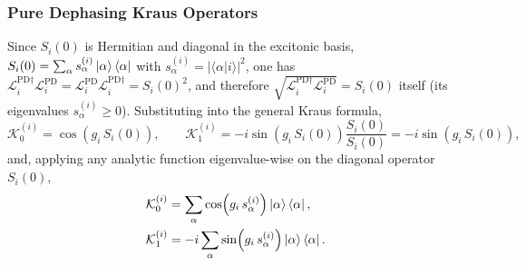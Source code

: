 \documentclass[a4paper,12pt]{article}
\begin{document}
\subsubsection{Pure Dephasing Kraus Operators}
Since $S_{i}(0)$ is Hermitian and diagonal in the excitonic basis, $S_{i}(0) = \sum_{\alpha} s_{\alpha}^{(i)} \Ket{\alpha}\Bra{\alpha}$ with $s_{\alpha}^{(i)} = |\langle\alpha|i\rangle|^{2}$, one has $\mathcal{L}_{i}^{\text{PD}\dagger}\mathcal{L}_{i}^{\text{PD}} = \mathcal{L}_{i}^{\text{PD}}\mathcal{L}_{i}^{\text{PD}\dagger} = S_{i}(0)^{2}$, and therefore $\sqrt{\mathcal{L}_{i}^{\text{PD}\dagger}\mathcal{L}_{i}^{\text{PD}}} = S_{i}(0)$ itself (its eigenvalues $s_\alpha^{(i)}\geq0$). Substituting into the general Kraus formula,
\begin{equation}
	\mathcal{K}_{0}^{(i)} = \cos\!\left(g_{i}\, S_{i}(0)\right), \qquad
	\mathcal{K}_{1}^{(i)} = -i\sin\!\left(g_{i}\, S_{i}(0)\right)\frac{S_{i}(0)}{S_{i}(0)} = -i\sin\!\left(g_{i}\, S_{i}(0)\right),
\end{equation}
and, applying any analytic function eigenvalue-wise on the diagonal operator $S_i(0)$,
\begin{align}
	\mathcal{K}_{0}^{(i)} &= \sum_{\alpha} \cos\!\left(g_{i}\, s_{\alpha}^{(i)}\right) \Ket{\alpha}\Bra{\alpha}, \\
	\mathcal{K}_{1}^{(i)} &= -i \sum_{\alpha} \sin\!\left(g_{i}\, s_{\alpha}^{(i)}\right) \Ket{\alpha}\Bra{\alpha}.
	\label{eq:kraus_dephasing_explicit}
\end{align}
\end{document}
